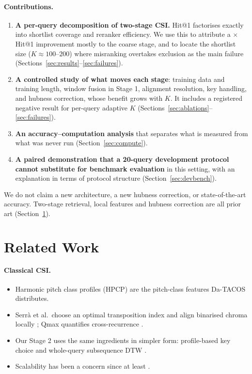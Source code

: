 \documentclass[10pt]{article}
\begin{document}
\paragraph{Contributions.}
\begin{enumerate}
\item \textbf{A per-query decomposition of two-stage CSI.} Hit@1 factorises exactly into shortlist coverage and reranker efficiency. We use this to attribute a \HitOneGain$\times$ Hit@1 improvement mostly to the coarse stage, and to locate the shortlist size ($K\approx100$--$200$) where misranking overtakes exclusion as the main failure (Sections~\ref{sec:results}--\ref{sec:failures}).
\item \textbf{A controlled study of what moves each stage}: training data and training length, window fusion in Stage 1, alignment resolution, key handling, and hubness correction, whose benefit grows with $K$. It includes a registered negative result for per-query adaptive $K$ (Sections~\ref{sec:ablations}--\ref{sec:failures}).
\item \textbf{An accuracy--computation analysis} that separates what is measured from what was never run (Section~\ref{sec:compute}).
\item \textbf{A paired demonstration that a 20-query development protocol cannot substitute for benchmark evaluation} in this setting, with an explanation in terms of protocol structure (Section~\ref{sec:devbench}).
\end{enumerate}
We do not claim a new architecture, a new hubness correction, or state-of-the-art accuracy. Two-stage retrieval, local features and hubness correction are all prior art (Section~\ref{sec:related}).

\section{Related Work}\label{sec:related}
\paragraph{Classical CSI.}
\begin{itemize}
\item Harmonic pitch class profiles (HPCP) \citep{gomez2006} are the pitch-class features Da-TACOS distributes.
\item Serr\`a et al.\ choose an optimal transposition index and align binarised chroma locally \citep{serra2008}; Qmax quantifies cross-recurrence \citep{serra2009qmax}.
\item Our Stage 2 uses the same ingredients in simpler form: profile-based key choice and whole-query subsequence DTW \citep{sakoe1978,muller2015}.
\item Scalability has been a concern since at least \citet{bertinmahieux2012}.
\end{itemize}
\end{document}
